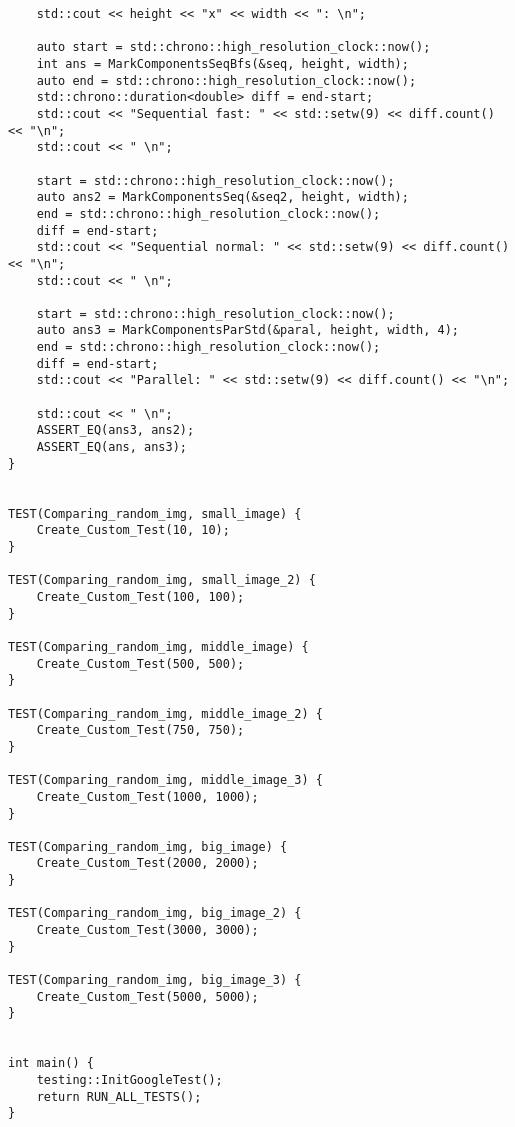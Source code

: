 \documentclass{report}
\begin{document}
\begin{lstlisting}
    std::cout << height << "x" << width << ": \n";

    auto start = std::chrono::high_resolution_clock::now();
    int ans = MarkComponentsSeqBfs(&seq, height, width);
    auto end = std::chrono::high_resolution_clock::now();
    std::chrono::duration<double> diff = end-start;
    std::cout << "Sequential fast: " << std::setw(9) << diff.count() << "\n";
    std::cout << " \n";

    start = std::chrono::high_resolution_clock::now();
    auto ans2 = MarkComponentsSeq(&seq2, height, width);
    end = std::chrono::high_resolution_clock::now();
    diff = end-start;
    std::cout << "Sequential normal: " << std::setw(9) << diff.count() << "\n";
    std::cout << " \n";

    start = std::chrono::high_resolution_clock::now();
    auto ans3 = MarkComponentsParStd(&paral, height, width, 4);
    end = std::chrono::high_resolution_clock::now();
    diff = end-start;
    std::cout << "Parallel: " << std::setw(9) << diff.count() << "\n";

    std::cout << " \n";
    ASSERT_EQ(ans3, ans2);
    ASSERT_EQ(ans, ans3);
}


TEST(Comparing_random_img, small_image) {
    Create_Custom_Test(10, 10);
}

TEST(Comparing_random_img, small_image_2) {
    Create_Custom_Test(100, 100);
}

TEST(Comparing_random_img, middle_image) {
    Create_Custom_Test(500, 500);
}

TEST(Comparing_random_img, middle_image_2) {
    Create_Custom_Test(750, 750);
}

TEST(Comparing_random_img, middle_image_3) {
    Create_Custom_Test(1000, 1000);
}

TEST(Comparing_random_img, big_image) {
    Create_Custom_Test(2000, 2000);
}

TEST(Comparing_random_img, big_image_2) {
    Create_Custom_Test(3000, 3000);
}

TEST(Comparing_random_img, big_image_3) {
    Create_Custom_Test(5000, 5000);
}


int main() {
    testing::InitGoogleTest();
    return RUN_ALL_TESTS();
}


\end{lstlisting}
\end{document}
